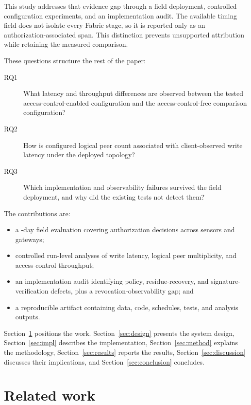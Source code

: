 \documentclass[a4paper,fleqn]{cas-sc}
\begin{document}
This study addresses that evidence gap through a field deployment, controlled
configuration experiments, and an implementation audit. The available timing
field does not isolate every Fabric stage, so it is reported only as an
authorization-associated span. This distinction prevents unsupported
attribution while retaining the measured comparison.

These questions structure the rest of the paper:

\begin{description}
\item[RQ1] What latency and throughput differences are observed between the
  tested access-control-enabled configuration and the access-control-free
  comparison configuration?
\item[RQ2] How is configured logical peer count associated with
  client-observed write latency under the deployed topology?
\item[RQ3] Which implementation and observability failures survived the
  field deployment, and why did the existing tests not detect them?
\end{description}

The contributions are:
\begin{itemize}
\item a \DeployDays{}-day field evaluation covering \TotalDecisions{}
authorization decisions across \DeploySensors{} sensors and
\DeployGateways{} gateways;
\item controlled run-level analyses of write latency, logical peer
multiplicity, and access-control throughput;
\item an implementation audit identifying policy, residue-recovery, and
signature-verification defects, plus a revocation-observability gap; and
\item a reproducible artifact containing data, code, schedules, tests, and
analysis outputs.
\end{itemize}

Section~\ref{sec:related} positions the work. Section~\ref{sec:design}
presents the system design, Section~\ref{sec:impl} describes the
implementation, Section~\ref{sec:method} explains the methodology,
Section~\ref{sec:results} reports the results, Section~\ref{sec:discussion}
discusses their implications, and Section~\ref{sec:conclusion} concludes.

\section{Related work}
\label{sec:related}
\end{document}
